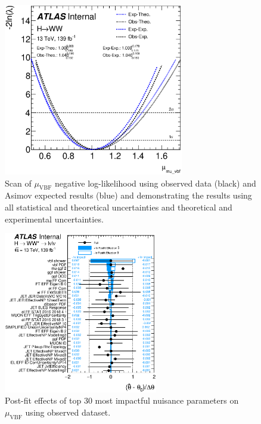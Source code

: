 \begin{figure}[!h]
\centering
\includegraphics[width=0.7\textwidth]{Pictures/fitresults/mu_vbf.eps}
\caption{Scan of $\mu_{\text{VBF}}$ negative log-likelihood using observed data (black) and Asimov expected results (blue) and demonstrating the results using all statistical and theoretical uncertainties and theoretical and experimental uncertainties.}
\label{fig:scan2}
\end{figure}

\begin{figure}[!h]
\centering
      \includegraphics[width=0.6\textwidth]{Pictures/fitresults/impact_data_mu_vbf.eps}
{\caption{Post-fit effects of top 30 most impactful nuisance parameters on $\mu_{\text{VBF}}$ using observed dataset.}
\label{fig:impacts}}
\end{figure}


